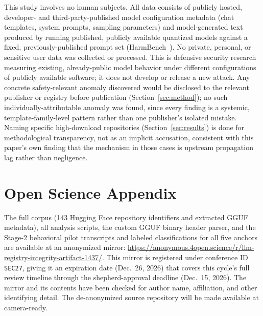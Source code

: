\documentclass[letterpaper,twocolumn,10pt]{article}
\begin{document}
This study involves no human subjects. All data consists of publicly hosted, developer- and third-party-published model configuration metadata (chat templates, system prompts, sampling parameters) and model-generated text produced by running published, publicly available quantized models against a fixed, previously-published prompt set (HarmBench~\cite{mazeika2024harmbench}). No private, personal, or sensitive user data was collected or processed. This is defensive security research measuring existing, already-public model behavior under different configurations of publicly available software; it does not develop or release a new attack. Any concrete safety-relevant anomaly discovered would be disclosed to the relevant publisher or registry before publication (Section~\ref{sec:method}); no such individually-attributable anomaly was found, since every finding is a systemic, template-family-level pattern rather than one publisher's isolated mistake. Naming specific high-download repositories (Section~\ref{sec:results}) is done for methodological transparency, not as an implicit accusation, consistent with this paper's own finding that the mechanism in those cases is upstream propagation lag rather than negligence.

\section*{Open Science Appendix}

The full corpus (143 Hugging Face repository identifiers and extracted GGUF metadata), all analysis scripts, the custom GGUF binary header parser, and the Stage-2 behavioral pilot transcripts and labeled classifications for all five anchors are available at an anonymized mirror: \url{https://anonymous.4open.science/r/llm-registry-integrity-artifact-1437/}. This mirror is registered under conference ID \texttt{SEC27}, giving it an expiration date (Dec.\ 26, 2026) that covers this cycle's full review timeline through the shepherd-approval deadline (Dec.\ 15, 2026). The mirror and its contents have been checked for author name, affiliation, and other identifying detail. The de-anonymized source repository will be made available at camera-ready.



\end{document}
